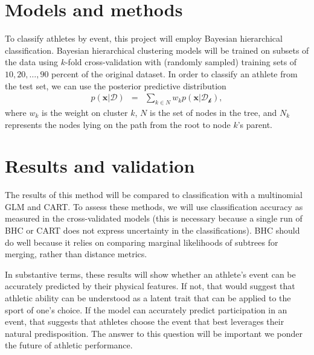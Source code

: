 \documentclass[twoside]{article}
\begin{document}
\section{Models and methods}


To classify athletes by event, this project will employ Bayesian hierarchical classification. Bayesian hierarchical clustering models will be trained on subsets of the data using $k$-fold cross-validation with (randomly sampled) training sets of $10,20,\ldots,90$ percent of the original dataset. In order to classify an athlete from the test set, we can use the posterior predictive distribution
\begin{eqnarray*}
p(\mathbf{x}|\mathcal{D}) &=& \sum_{k \in N} w_k p(\mathbf{x}|\mathcal{D_k}),
\end{eqnarray*}
where $w_k$ is the weight on cluster $k$, $N$ is the set of nodes in the tree, and $N_k$ represents the nodes lying on the path from the root to node $k$'s parent. 

\section{Results and validation}


The results of this method will be compared to classification with a multinomial GLM and CART. To assess these methods, we will use classification accuracy as measured in the cross-validated models (this is necessary because a single run of BHC or CART does not express uncertainty in the classifications). BHC should do well because it relies on comparing marginal likelihoods of subtrees for merging, rather than distance metrics.

In substantive terms, these results will show whether an athlete's event can be accurately predicted by their physical features. If not, that would suggest that athletic ability can be understood as a latent trait that can be applied to the sport of one's choice. If the model can accurately predict participation in an event, that suggests that athletes choose the event that best leverages their natural predisposition. The answer to this question will be important we ponder the future of athletic performance.

\end{document}
